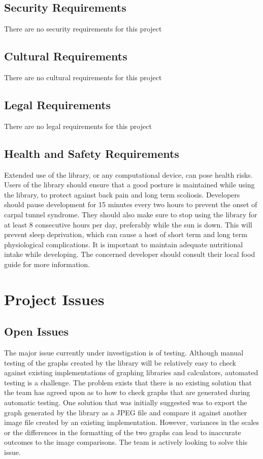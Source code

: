 \documentclass[12pt, titlepage]{article}
\begin{document}
\subsection{Security Requirements}
There are no security requirements for this project
\subsection{Cultural Requirements}
There are no cultural requirements for this project
\subsection{Legal Requirements}
There are no legal requirements for this project
\subsection{Health and Safety Requirements} %

Extended use of the library, or any computational device, can pose health risks. Users of the library should ensure that a good posture is maintained while using the library, to protect against back pain and long term scoliosis. Developers should pause development for 15 minutes every two hours to prevent the onset of carpal tunnel syndrome. They should also make sure to stop using the library for at least 8 consecutive hours per day, preferably while the sun is down. This will prevent sleep deprivation, which can cause a host of short term and long term physiological complications. It is important to maintain adequate nutritional intake while developing. The concerned developer should consult their local food guide for more information.

\section{Project Issues}

\subsection{Open Issues}
The major issue currently under investigation is of testing. Although manual testing of the graphs created by the library will be relatively easy to check against existing implementations of graphing libraries and calculators, automated testing is a challenge. The problem exists that there is no existing solution that the team has agreed upon as to how to check graphs that are generated during automatic testing. One solution that was initially suggested was to export the graph generated by the library as a JPEG file and compare it against another image file created by an existing implementation. However, variances in the scales or the differences in the formatting of the two graphs can lead to inaccurate outcomes to the image comparisons. The team is actively looking to solve this issue. 
\end{document}
